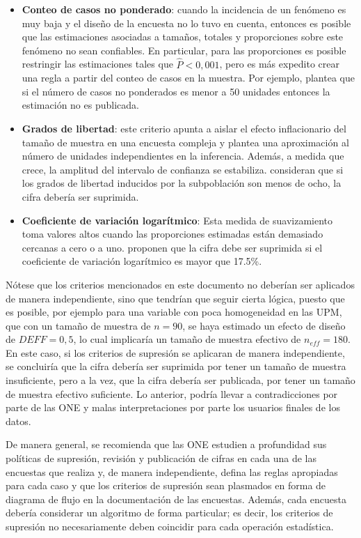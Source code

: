 \documentclass[12pt,spanish,]{book}
\begin{document}
\begin{itemize}
\item
  \textbf{Conteo de casos no ponderado}: cuando la incidencia de un fenómeno es muy baja y el diseño de la encuesta no lo tuvo en cuenta, entonces es posible que las estimaciones asociadas a tamaños, totales y proporciones sobre este fenómeno no sean confiables. En particular, para las proporciones es posible restringir las estimaciones tales que \(\hat P <0,001\), pero es más expedito crear una regla a partir del conteo de casos en la muestra. Por ejemplo, \textcite{AmericanCommunitySurvey} plantea que si el número de casos no ponderados es menor a 50 unidades entonces la estimación no es publicada.
\item
  \textbf{Grados de libertad}: este criterio apunta a aislar el efecto inflacionario del tamaño de muestra en una encuesta compleja y plantea una aproximación al número de unidades independientes en la inferencia. Además, a medida que crece, la amplitud del intervalo de confianza se estabiliza. \textcite{Parker_Talih_Malec_2017} consideran que si los grados de libertad inducidos por la subpoblación son menos de ocho, la cifra debería ser suprimida.
\item
  \textbf{Coeficiente de variación logarítmico}: Esta medida de suavizamiento toma valores altos cuando las proporciones estimadas están demasiado cercanas a cero o a uno. \textcite{Barnett_Walker_Chromy_Davis_Emrich_Odom_Packer_2003} proponen que la cifra debe ser suprimida si el coeficiente de variación logarítmico es mayor que 17.5\%.
\end{itemize}

Nótese que los criterios mencionados en este documento no deberían ser aplicados de manera independiente, sino que tendrían que seguir cierta lógica, puesto que es posible, por ejemplo para una variable con poca homogeneidad en las UPM, que con un tamaño de muestra de \(n=90\), se haya estimado un efecto de diseño de \(DEFF=0,5\), lo cual implicaría un tamaño de muestra efectivo de \(n_{eff}=180\). En este caso, si los criterios de supresión se aplicaran de manera independiente, se concluiría que la cifra debería ser suprimida por tener un tamaño de muestra insuficiente, pero a la vez, que la cifra debería ser publicada, por tener un tamaño de muestra efectivo suficiente. Lo anterior, podría llevar a contradicciones por parte de las ONE y malas interpretaciones por parte los usuarios finales de los datos.

De manera general, se recomienda que las ONE estudien a profundidad sus políticas de supresión, revisión y publicación de cifras en cada una de las encuestas que realiza y, de manera independiente, defina las reglas apropiadas para cada caso y que los criterios de supresión sean plasmados en forma de diagrama de flujo en la documentación de las encuestas. Además, cada encuesta debería considerar un algoritmo de forma particular; es decir, los criterios de supresión no necesariamente deben coincidir para cada operación estadística.
\end{document}
